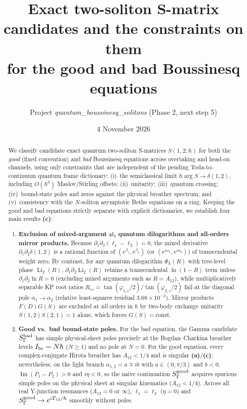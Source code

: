 \documentclass[11pt,a4paper]{article}
\title{Exact two-soliton S-matrix candidates and the constraints on them\\
for the good and bad Boussinesq equations}
\author{Project \emph{quantum\_boussinesq\_solitons} (Phase 2, next step 5)}
\date{4 November 2026}
\newcommand{\La}{\textsf{\textbf{(a)}}}
\newcommand{\Lc}{\textsf{\textbf{(c)}}}
\DeclareMathOperator{\Li}{Li}
\theoremstyle{remark}
\begin{document}
\maketitle

\begin{abstract}
We classify candidate exact quantum two-soliton S-matrices $S(1,2;\hbar)$ for both the \emph{good} (fixed convention) and \emph{bad} Boussinesq equations across overtaking and head-on channels, using only constraints that are independent of the pending Toda-to-continuum quantum frame dictionary: (i)~the semiclassical limit $\hbar\arg S\to\delta(1,2)$, including $O(\hbar^0)$ Maslov/Stirling offsets; (ii)~unitarity; (iii)~quantum crossing; (iv)~bound-state poles and zeros against the physical breather spectrum; and (v)~consistency with the $N$-soliton asymptotic Bethe equations on a ring.
Keeping the good and bad equations strictly separate with explicit dictionaries, we establish four main results \Lc:
\begin{enumerate}
\item \textbf{Exclusion of mixed-argument $\mathfrak{sl}_3$ quantum dilogarithms and all-orders mirror products.}
Because $\partial_1\partial_2(\ell_1-\ell_2)=0$, the mixed derivative $\partial_1\partial_2\delta(1,2)$ is a rational function of $(e^{\beta_1},e^{\beta_2})$ (or $(e^{i\alpha_1},e^{i\alpha_2})$) of transcendental weight zero. By contrast, for any quantum dilogarithm $\Phi_\hbar(R)$ with tree-level phase $\Li_2(R)$, $\partial_1\partial_2\Li_2(R)$ retains a transcendental $\ln(1-R)$ term unless $\partial_1\partial_2\ln R=0$ (excluding mixed arguments such as $R=A_{12}$), while multiplicatively separable KP root ratios $R_{rs}=\tan(\varphi_{1,r}/2)/\tan(\varphi_{2,s}/2)$ fail at the diagonal pole $\alpha_1\to\alpha_2$ (relative least-squares residual $3.68\times 10^{-2}$). Mirror products $F(D)G(S)$ are excluded at \emph{all} orders in $\hbar$ by two-body exchange unitarity $S(1,2)S(2,1)=1$ alone, which forces $G(S)=\text{const}$.
\item \textbf{Good vs.\ bad bound-state poles.}
For the bad equation, the Gamma candidate $S_\Gamma^{\rm bad}$ has simple physical-sheet poles precisely at the Bogdan--Charkina breather levels $I_{\rm br}=N\hbar$ ($N\ge 1$) and no pole at $N=0$. For the good equation, every complex-conjugate Hirota breather has $A_{12}<1/4$ and is singular \La/\Lc; nevertheless, on the light branch $\alpha_{1,2}=a\mp ib$ with $a\in(0,\pi/3)$ and $b<0$, $\operatorname{Im}(P_1-P_2)>0$ and $i\eta<0$, so the naive continuation $S_\Gamma^{\rm good}$ acquires spurious simple poles on the physical sheet at singular kinematics ($A_{12}<1/4$). Across all real Y-junction resonances ($A_{12}=0$ or $\infty$), $\ell_1=\ell_2$ ($\eta=0$) and $S_\Gamma^{\rm good}\to e^{iT_{12}/\hbar}$ smoothly without poles.

\end{enumerate}
\end{abstract}
\end{document}

